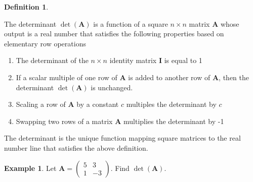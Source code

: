 \documentclass[
]{book}
\theoremstyle{definition}
\newtheorem{definition}{Definition}[chapter]
\theoremstyle{definition}
\newtheorem{example}{Example}[chapter]
\theoremstyle{definition}
\theoremstyle{definition}
\theoremstyle{remark}
\begin{document}
\begin{definition}
\protect\hypertarget{def:determinant}{}\label{def:determinant}

The determinant \(\operatorname{det}(\mathbf{A})\) is a function of a square \(n \times n\) matrix \(\mathbf{A}\) whose output is a real number that satisfies the following properties based on elementary row operations

\begin{enumerate}
\def\labelenumi{\arabic{enumi})}
\item
  The determinant of the \(n \times n\) identity matrix \(\mathbf{I}\) is equal to 1
\item
  If a scalar multiple of one row of \(\mathbf{A}\) is added to another row of \(\mathbf{A}\), then the determinant \(\operatorname{det}(\mathbf{A})\) is unchanged.
\item
  Scaling a row of \(\mathbf{A}\) by a constant \(c\) multiples the determinant by \(c\)
\item
  Swapping two rows of a matrix \(\mathbf{A}\) multiplies the determinant by -1
\end{enumerate}

\end{definition}

The determinant is the unique function mapping square matrices to the real number line that satisfies the above definition.

\begin{example}
Let \(\mathbf{A} = \begin{pmatrix} 5 & 3 \\ 1 & -3 \end{pmatrix}\). Find \(\operatorname{det}(\mathbf{A})\).
\end{example}
\end{document}
